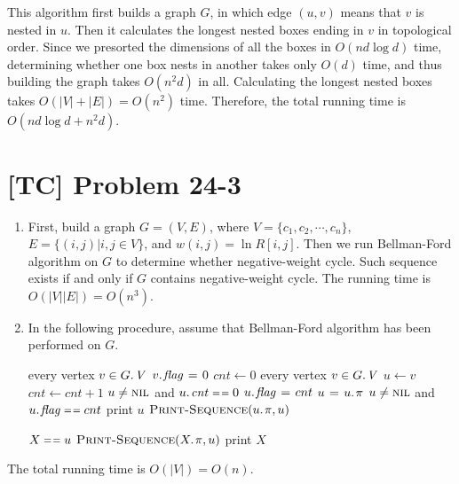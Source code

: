\documentclass[a4paper,11pt,twocolumn]{article}
\newcommand{\NIL}{\const{nil}}
\newcommand{\FALSE}{\const{false}}
\newcommand{\TRUE}{\const{true}}
\begin{document}
\begin{enumerate}
  This algorithm first builds a graph $G$, in which edge $(u, v)$ means that $v$ is nested in $u$. Then it calculates the longest nested boxes ending in $v$ in topological order. Since we presorted the dimensions of all the boxes in $O(nd \log d)$ time, determining whether one box nests in another takes only $O(d)$ time, and thus building the graph takes $O(n^2d)$ in all. Calculating the longest nested boxes takes $O(|V|+|E|) = O(n^2)$ time. Therefore, the total running time is $O(nd \log d + n^2d)$.
  \end{enumerate}

  \section{[TC] Problem 24-3}
  \begin{enumerate}
  \item First, build a graph $G=(V, E)$, where $V = \{c_1, c_2, \cdots, c_n\}$, $E = \{(i, j)| i, j \in V\}$, and $w(i, j) = \ln R[i,j]$. Then we run Bellman-Ford algorithm on $G$ to determine whether negative-weight cycle. Such sequence exists if and only if $G$ contains negative-weight cycle. The running time is $O(|V||E|) = O(n^3)$.
  \item In the following procedure, assume that Bellman-Ford algorithm has been performed on $G$.
  \begin{codebox}
  \li \For every vertex $v \in \attrib{G}{V}$
  \li \Do  $\attrib{v}{flag} \gets 0$
      \End
  \li $cnt \gets 0$
  \li \For every vertex $v \in \attrib{G}{V}$
  \li \Do $u \gets v$
  \li     $cnt \gets cnt + 1$
  \li     \While $u \neq \NIL$ and $\attrib{u}{cnt} \isequal 0$
  \li     \Do $\attrib{u}{flag} \gets cnt$
  \li         $u \gets \attrib{u}{\pi}$
  \li         \If $u \neq \NIL$ and $\attrib{u}{flag} \isequal cnt$
  \li         \Do print $u$
  \li             $\proc{Print-Sequence}(\attrib{u}{\pi}, u)$
  \li         \Return \TRUE
              \End
          \End
      \End
  \li \Return \FALSE
  \end{codebox}
  \begin{codebox}
  \li \If $X \isequal u$
  \li \Do \Return
      \End
  \li $\proc{Print-Sequence}(\attrib{X}{\pi}, u)$
  \li print $X$
  \end{codebox}
  \end{enumerate}

  The total running time is $O(|V|) = O(n)$.
\end{document}
